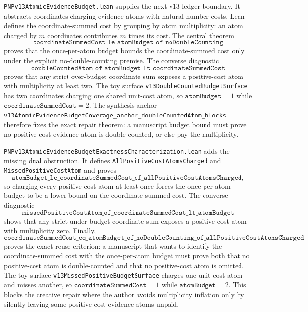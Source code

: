\documentclass[11pt]{article}
\theoremstyle{remark}
\begin{document}
\texttt{PNPv13AtomicEvidenceBudget.lean} supplies the next v13 ledger boundary.
It abstracts coordinates charging evidence atoms with natural-number costs.
Lean defines the coordinate-summed cost by grouping by atom multiplicity:
an atom charged by \(m\) coordinates contributes \(m\) times its cost.  The
central theorem
\[
  \texttt{coordinateSummedCost\_le\_atomBudget\_of\_noDoubleCounting}
\]
proves that the once-per-atom budget bounds the coordinate-summed cost only
under the explicit no-double-counting premise.  The converse diagnostic
\[
  \texttt{doubleCountedAtom\_of\_atomBudget\_lt\_coordinateSummedCost}
\]
proves that any strict over-budget coordinate sum exposes a positive-cost atom
with multiplicity at least two.  The toy surface
\texttt{v13DoubleCountedBudgetSurface} has two coordinates charging one shared
unit-cost atom, so \(\texttt{atomBudget}=1\) while
\(\texttt{coordinateSummedCost}=2\).  The synthesis anchor
\texttt{v13AtomicEvidenceBudgetCoverage\_anchor\_doubleCountedAtom\_blocks}
therefore fixes the exact repair theorem: a manuscript budget bound must prove
no positive-cost evidence atom is double-counted, or else pay the multiplicity.

\texttt{PNPv13AtomicEvidenceBudgetExactnessCharacterization.lean} adds the
missing dual obstruction.  It defines
\texttt{AllPositiveCostAtomsCharged} and
\texttt{MissedPositiveCostAtom} and proves
\[
  \texttt{atomBudget\_le\_coordinateSummedCost\_of\_allPositiveCostAtomsCharged},
\]
so charging every positive-cost atom at least once forces the once-per-atom
budget to be a lower bound on the coordinate-summed cost.  The converse
diagnostic
\[
  \texttt{missedPositiveCostAtom\_of\_coordinateSummedCost\_lt\_atomBudget}
\]
shows that any strict under-budget coordinate sum exposes a positive-cost atom
with multiplicity zero.  Finally,
\[
  \texttt{coordinateSummedCost\_eq\_atomBudget\_of\_noDoubleCounting\_of\_allPositiveCostAtomsCharged}
\]
proves the exact reuse criterion: a manuscript that wants to identify the
coordinate-summed cost with the once-per-atom budget must prove both that no
positive-cost atom is double-counted and that no positive-cost atom is omitted.
The toy surface \texttt{v13MissedPositiveBudgetSurface} charges one unit-cost
atom and misses another, so \(\texttt{coordinateSummedCost}=1\) while
\(\texttt{atomBudget}=2\).  This blocks the creative repair where the author
avoids multiplicity inflation only by silently leaving some positive-cost
evidence atoms unpaid.
\end{document}
